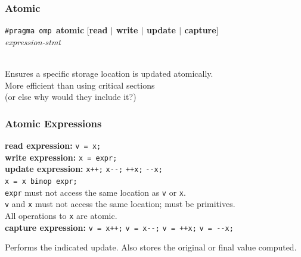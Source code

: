 \begin{frame}[fragile]
  \frametitle{Atomic}

  \Large
  \begin{changemargin}{1.5cm}
  \begin{center}
    {\tt \#pragma omp }{\bf atomic} [{\bf read $\mid$ write $\mid$ update $\mid$ capture}]\\
    {\it expression-stmt}
  \end{center}~\\

    Ensures a specific storage location is updated atomically.\\[1em]
    More efficient than using critical sections \\
      \hspace*{2em} (or else why would they
      include it?)\\[2em]

  \end{changemargin}

\end{frame}

\begin{frame}[fragile]
  \frametitle{Atomic Expressions}

  \begin{changemargin}{1cm}

  {\bf read expression:} {\tt v = x;}\\[1em]

  {\bf write expression:} {\tt x = expr;}\\[1em]

  {\bf update expression:} {\tt x++;} {\tt x{-}-;} {\tt ++x;} {\tt -{-}x;}\\
  \hspace{9em}{\tt x binop= expr;} {\tt x = x binop expr;}\\[1em]

    {\tt expr} must not access the same location as {\tt v} or {\tt x}.\\
    {\tt v} and {\tt x} must not access the same location; must be
      primitives.\\
    All operations to {\tt x} are atomic.\\[2em]

  {\bf capture expression:} {\tt v = x++;} {\tt v = x{-}-;} {\tt v = ++x;}
  {\tt v = -{-}x;}\\ \hspace{9.2em}{\tt v = x binop= expr;}

  Performs the indicated update. Also stores the original or
  final value computed.
  \end{changemargin}

\end{frame}

